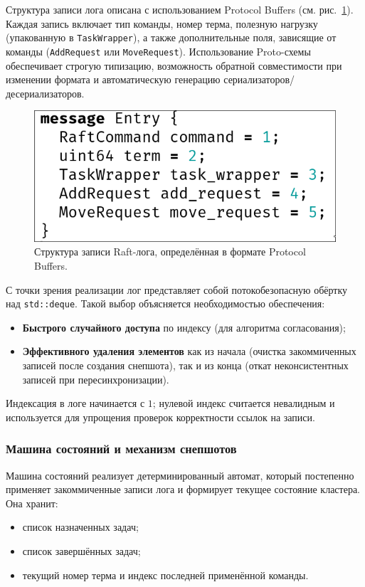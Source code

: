 Структура записи лога описана с использованием Protocol Buffers
(см. рис.~\ref{fig:raftlog}). Каждая запись включает тип команды,
номер терма, полезную нагрузку (упакованную в \texttt{TaskWrapper}),
а также дополнительные поля, зависящие от команды
(\texttt{AddRequest} или \texttt{MoveRequest}).
Использование Proto-схемы обеспечивает строгую типизацию,
возможность обратной совместимости при изменении формата и
автоматическую генерацию сериализаторов/десериализаторов.

\begin{figure}[h!]
    \centering
    \includegraphics[width=0.6\linewidth]{inc/raft_log_entry.png}
    \caption{Структура записи Raft-лога, определённая в формате Protocol Buffers.}
    \label{fig:raftlog}
\end{figure}

С точки зрения реализации лог представляет собой потокобезопасную обёртку над
\texttt{std::deque}. Такой выбор объясняется необходимостью обеспечения:

\begin{itemize}
    \item \textbf{Быстрого случайного доступа} по индексу (для алгоритма согласования);
    \item \textbf{Эффективного удаления элементов} как из начала
    (очистка закоммиченных записей после создания снепшота),
    так и из конца (откат неконсистентных записей при пересинхронизации).
\end{itemize}

Индексация в логе начинается с $1$; нулевой индекс считается невалидным и
используется для упрощения проверок корректности ссылок на записи.

\subsubsection{Машина состояний и механизм снепшотов}

Машина состояний реализует детерминированный автомат, который постепенно
применяет закоммиченные записи лога и формирует текущее состояние кластера. Она
хранит:

\begin{itemize}
    \item список назначенных задач;
    \item список завершённых задач;
    \item текущий номер терма и индекс последней применённой команды.
\end{itemize}

